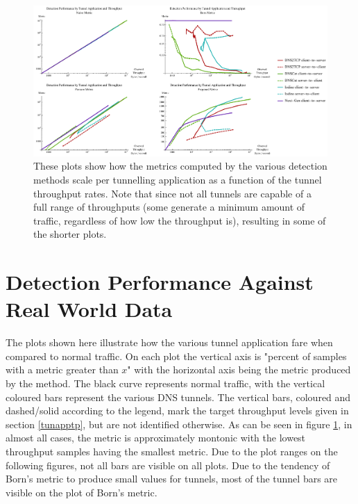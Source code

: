 \documentclass[12pt]{report}
\theoremstyle{remark}
\theoremstyle{definition}
\theoremstyle{definition}
\theoremstyle{definition}
\begin{document}
\begin{landscape}
\begin{figure}
\centering
\includegraphics[width=1.4\textwidth]{figures/mpbtt.pdf}
\caption[Scaling of Detection Metrics by Tunnel Throughput]{These plots show how
the metrics computed by the various detection methods scale per tunnelling
application as a function of the tunnel throughput rates. Note that since not
all tunnels are capable of a full range of throughputs (some generate a minimum
amount of traffic, regardless of how low the throughput is), resulting in some
of the shorter plots.}
\label{mbtt}
\end{figure}
\end{landscape}

\section{Detection Performance Against Real World Data}
\label{detection-perf}

The plots shown here illustrate how the various tunnel application fare when
compared to normal traffic. On each plot the vertical axis is "percent of
samples with a metric greater than $x$" with the horizontal axis being the
metric produced by the method. The black curve represents normal traffic, with
the vertical coloured bars represent the various DNS tunnels. The vertical bars,
coloured and dashed/solid according to the legend, mark the target throughput
levels given in section \ref{tunapptp}, but are not identified otherwise. As can
be seen in figure \ref{mbtt}, in almost all cases, the metric is approximately
montonic with the lowest throughput samples having the smallest metric. Due to
the plot ranges on the following figures, not all bars are visible on all plots.
Due to the tendency of Born's metric to produce small values for tunnels, most
of the tunnel bars are visible on the plot of Born's metric.
\end{document}
